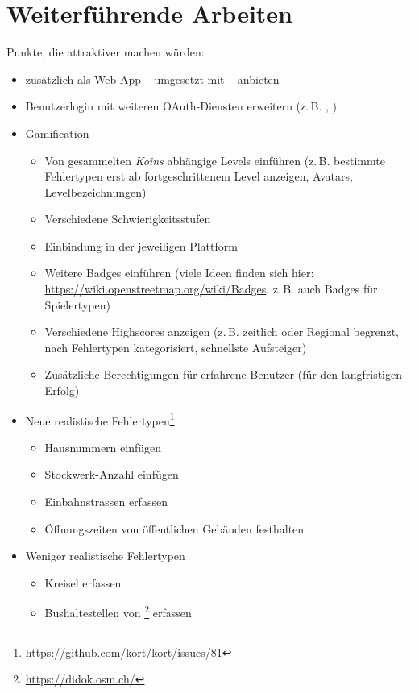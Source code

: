 \section{Weiterführende Arbeiten}
\label{pd-weiterentwicklung-realistisch}
Punkte, die \kort{} attraktiver machen würden:

\begin{itemize}
	\item \kort{} zusätzlich als Web-App -- umgesetzt mit  -- anbieten
	\item Benutzerlogin mit weiteren \gls{OAuth}-Diensten erweitern (z.\,B. , )
	\item \gls{Gamification}
	\begin{itemize}
		\item Von gesammelten \emph{Koins} abhängige Levels einführen (z.\,B. bestimmte Fehlertypen erst ab fortgeschrittenem Level anzeigen, Avatars, Levelbezeichnungen)
		\item Verschiedene Schwierigkeitsstufen
		\item Einbindung in  der jeweiligen Plattform
		\item Weitere Badges einführen (viele Ideen finden sich hier: \url{https://wiki.openstreetmap.org/wiki/Badges}, z.\,B. auch Badges für Spielertypen)
		\item Verschiedene Highscores anzeigen (z.\,B. zeitlich oder Regional begrenzt, nach Fehlertypen kategorisiert, schnellste Aufsteiger)
		\item Zusätzliche Berechtigungen für erfahrene Benutzer (für den langfristigen Erfolg)
	\end{itemize}
	\item Neue realistische Fehlertypen\footnote{\url{https://github.com/kort/kort/issues/81}}
	\begin{itemize}
		\item Hausnummern einfügen
		\item Stockwerk-Anzahl einfügen
		\item Einbahnstrassen erfassen
		\item Öffnungszeiten von öffentlichen Gebäuden festhalten
	\end{itemize}
	\item Weniger realistische Fehlertypen
		\begin{itemize}
			\item Kreisel erfassen
			\item Bushaltestellen von \footnote{\url{https://didok.osm.ch/}} erfassen

\end{itemize}
\end{itemize}
